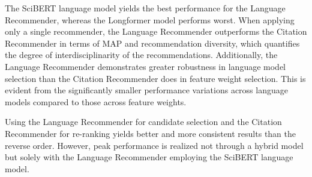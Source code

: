 The SciBERT language model yields the best performance for the Language Recommender, whereas the Longformer model performs worst.
When applying only a single recommender, the Language Recommender outperforms the Citation Recommender in terms of \ac{MAP} and recommendation diversity, which quantifies the degree of interdisciplinarity of the recommendations.
Additionally, the Language Recommender demonstrates greater robustness in language model selection than the Citation Recommender does in feature weight selection. This is evident from the significantly smaller performance variations across language models compared to those across feature weights.

Using the Language Recommender for candidate selection and the Citation Recommender for re-ranking yields better and more consistent results than the reverse order.
However, peak performance is realized not through a hybrid model but solely with the Language Recommender employing the SciBERT language model.
